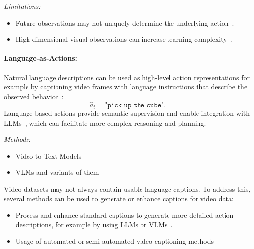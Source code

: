 \textit{Limitations:}
\begin{itemize}
    \item Future observations may not uniquely determine the underlying action~\cite{A_hierarchical_representation_for_future_action_prediction}.
    \item High-dimensional visual observations can increase learning complexity~\cite{A_hierarchical_representation_for_future_action_prediction, Losey2021LearningLA}.
\end{itemize}





\paragraph{Language-as-Actions:}

Natural language descriptions can be used as high-level action representations for example by captioning video frames with language instructions that describe the observed behavior~\cite{belkhale2024rt, shi2024yell, xiang2024pandora}:
\begin{equation}
\hat{a}_t = \texttt{"pick up the cube"}.
\end{equation}
Language-based actions provide semantic supervision and enable integration with \acp{LLM}~\cite{Du2023VideoLP}, which can facilitate more complex reasoning and planning.

\textit{Methods:}
\begin{itemize}
    
    \item Video-to-Text Models~\cite{McCarthy_2025}
    \item \acp{VLM} and variants of them~\cite{McCarthy_2025}
\end{itemize}

Video datasets may not always contain usable language captions. To address this, several methods can be used to generate or enhance captions for video data: 
\begin{itemize}
    \item Process and enhance standard captions to generate more detailed action descriptions, for example by using \acp{LLM} or \acp{VLM}~\cite{Mu2023EmbodiedGPTVP}.
    \item Usage of automated or semi-automated video captioning methods~\cite{Mu2023EmbodiedGPTVP}
\end{itemize}


